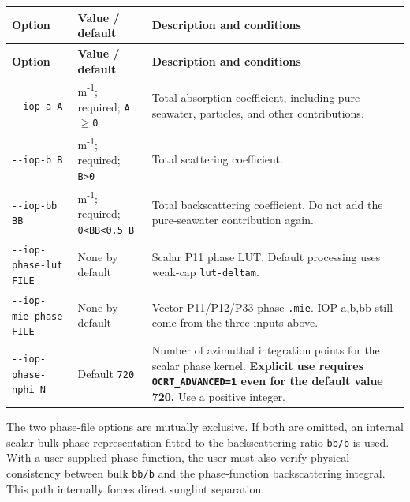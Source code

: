 {\TableFont
\begin{longtable}{@{}>{\raggedright\arraybackslash}p{}>{\raggedright\arraybackslash}p{}>{\raggedright\arraybackslash}p{}@{}}
\toprule
\textbf{Option} & \textbf{Value / default} & \textbf{Description and conditions} \\
\midrule
\endfirsthead
\toprule
\textbf{Option} & \textbf{Value / default} & \textbf{Description and conditions} \\
\midrule
\endhead
\bottomrule
\endfoot
\texttt{-\allowbreak{}-\allowbreak{}iop-\allowbreak{}a A} & m\textsuperscript{-}\textsuperscript{1}; required; \texttt{A\ensuremath{\geq}0} & Total absorption coefficient, including pure seawater, particles, and other contributions. \\
\texttt{-\allowbreak{}-\allowbreak{}iop-\allowbreak{}b B} & m\textsuperscript{-}\textsuperscript{1}; required; \texttt{B>0} & Total scattering coefficient. \\
\texttt{-\allowbreak{}-\allowbreak{}iop-\allowbreak{}bb BB} & m\textsuperscript{-}\textsuperscript{1}; required; \texttt{0<BB<0.\allowbreak{}5 B} & Total backscattering coefficient. Do not add the pure-seawater contribution again. \\
\texttt{-\allowbreak{}-\allowbreak{}iop-\allowbreak{}phase-\allowbreak{}lut FILE} & None by default & Scalar P11 phase LUT. Default processing uses weak-cap \texttt{lut-\allowbreak{}deltam}. \\
\texttt{-\allowbreak{}-\allowbreak{}iop-\allowbreak{}mie-\allowbreak{}phase FILE} & None by default & Vector P11/P12/P33 phase \texttt{.\allowbreak{}mie}. IOP a,b,bb still come from the three inputs above. \\
\texttt{-\allowbreak{}-\allowbreak{}iop-\allowbreak{}phase-\allowbreak{}nphi N} & Default \texttt{720} & Number of azimuthal integration points for the scalar phase kernel. \textbf{Explicit use requires \texttt{OCRT\_\allowbreak{}ADVANCED=\allowbreak{}1} even for the default value 720.} Use a positive integer. \\
\end{longtable}
}

The two phase-file options are mutually exclusive. If both are omitted, an internal scalar bulk phase representation fitted to the backscattering ratio \texttt{bb/\allowbreak{}b} is used. With a user-supplied phase function, the user must also verify physical consistency between bulk \texttt{bb/\allowbreak{}b} and the phase-function backscattering integral. This path internally forces direct sunglint separation.

